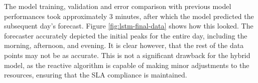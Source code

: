The model training, validation and error comparison with previous model performances took approximately 3 minutes, after which the model predicted the subsequent day's forecast. Figure \ref{fig:lstm-final-data} shows how this looked. The forecaster accurately depicted the initial peaks for the entire day, including the morning, afternoon, and evening. It is clear however, that the rest of the data points may not be as accurate. This is not a significant drawback for the hybrid model, as the reactive algorithm is capable of making minor adjustments to the resources, ensuring that the SLA compliance is maintained.

